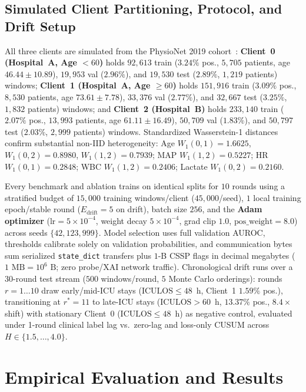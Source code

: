 \documentclass{llncs}
\begin{document}
\subsection{Simulated Client Partitioning, Protocol, and Drift Setup}

All three clients are simulated from the PhysioNet 2019 cohort~\cite{23}:
\textbf{Client~0 (Hospital~A, Age $<60$)} holds $92{,}613$ train ($3.24\%$ pos., $5{,}705$ patients, age $46.44\pm10.89$), $19{,}953$ val ($2.96\%$), and $19{,}530$ test ($2.89\%$, $1{,}219$ patients) windows; \textbf{Client~1 (Hospital~A, Age $\ge 60$)} holds $151{,}916$ train ($3.09\%$ pos., $8{,}530$ patients, age $73.61\pm7.78$), $33{,}376$ val ($2.77\%$), and $32{,}667$ test ($3.25\%$, $1{,}832$ patients) windows; and \textbf{Client~2 (Hospital~B)} holds $233{,}140$ train ($2.07\%$ pos., $13{,}993$ patients, age $61.11\pm16.49$), $50{,}709$ val ($1.83\%$), and $50{,}797$ test ($2.03\%$, $2{,}999$ patients) windows. Standardized Wasserstein-1 distances confirm substantial non-IID heterogeneity: Age $W_1(0,1)=1.6625$, $W_1(0,2)=0.8980$, $W_1(1,2)=0.7939$; MAP $W_1(1,2)=0.5227$; HR $W_1(0,1)=0.2848$; WBC $W_1(1,2)=0.2406$; Lactate $W_1(0,2)=0.2160$.

Every benchmark and ablation trains on identical splits for $10$ rounds using a stratified budget of $15{,}000$ training windows/client ($45{,}000$/seed), $1$ local training epoch/stable round ($E_{\mathrm{drift}}=5$ on drift), batch size $256$, and the \textbf{Adam optimizer} ($\mathrm{lr}=5\times 10^{-4}$, weight decay $5\times 10^{-4}$, grad clip $1.0$, $\mathrm{pos\_weight}=8.0$) across seeds $\{42,123,999\}$. Model selection uses full validation AUROC, thresholds calibrate solely on validation probabilities, and communication bytes sum serialized \texttt{state\_dict} transfers plus $1$-B CSSP flags in decimal megabytes ($1\text{ MB}=10^6\text{ B}$; zero probe/XAI network traffic). Chronological drift runs over a 30-round test stream ($500$ windows/round, $5$ Monte Carlo orderings): rounds $r=1\dots 10$ draw early/mid-ICU stays ($\mathrm{ICULOS}\le 48$~h, Client~1 $1.59\%$ pos.), transitioning at $r^*=11$ to late-ICU stays ($\mathrm{ICULOS}>60$~h, $13.37\%$ pos., $8.4\times$ shift) with stationary Client~0 ($\mathrm{ICULOS}\le 48$~h) as negative control, evaluated under 1-round clinical label lag vs.\ zero-lag and loss-only CUSUM across $H\in\{1.5,\dots,4.0\}$.


\section{Empirical Evaluation and Results}
\end{document}
